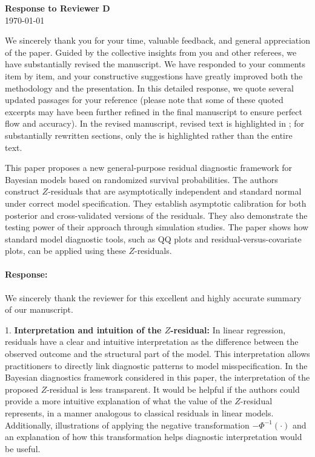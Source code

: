 \documentclass[11pt]{article}
\newcommand*{\mybox}[2]{%
  \par\medskip\noindent
  \colorbox{#1!30}{\parbox{.98\linewidth}{#2}}%
  \par\medskip
}
\begin{document}
\begin{center}
    {\LARGE \textbf{Response to Reviewer D}} \\[1em]
    {\large \today}
\end{center}
\vspace{2em} %
\normalsize
\normalsize

We sincerely thank you for your time, valuable feedback, and general appreciation of the paper. Guided by the collective insights from you and other referees, we have substantially revised the manuscript. We have responded to your comments item by item, and your constructive suggestions have greatly improved both the methodology and the presentation. In this detailed response, we quote several updated passages for your reference (please note that some of these quoted excerpts may have been further refined in the final manuscript to ensure perfect flow and accuracy). In the revised manuscript, revised text is highlighted in ; for substantially rewritten sections, only the  is highlighted rather than the entire text. 

\mybox{gray}{This paper proposes a new general-purpose residual diagnostic framework for Bayesian models based on randomized survival probabilities. The authors construct $Z$-residuals that are asymptotically independent and standard normal under correct model specification. They establish asymptotic calibration for both posterior and cross-validated versions of the residuals. They also demonstrate the testing power of their approach through simulation studies. The paper shows how standard model diagnostic tools, such as QQ plots and residual-versus-covariate plots, can be applied using these $Z$-residuals.}

\paragraph{Response:} We sincerely thank the reviewer for this excellent and highly accurate summary of our manuscript. 


\medskip

\mybox{gray}{1. \textbf{Interpretation and intuition of the $Z$-residual:} In linear regression, residuals have a clear and intuitive interpretation as the difference between the observed outcome and the structural part of the model. This interpretation allows practitioners to directly link diagnostic patterns to model misspecification. In the Bayesian diagnostics framework considered in this paper, the interpretation of the proposed $Z$-residual is less transparent. It would be helpful if the authors could provide a more intuitive explanation of what the value of the $Z$-residual represents, in a manner analogous to classical residuals in linear models. Additionally, illustrations of applying the negative transformation $-\Phi^{-1}(\cdot)$ and an explanation of how this transformation helps diagnostic interpretation would be useful.}
\end{document}

